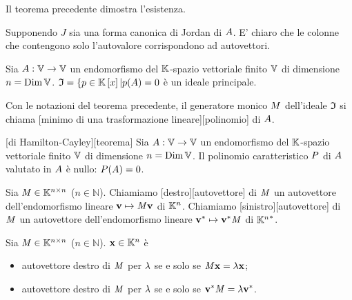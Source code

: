 \Proof Il teorema precedente dimostra l'esistenza.
\par Supponendo $J$ sia una forma canonica di Jordan di $A$.
E' chiaro che le colonne che contengono solo l'autovalore corrispondono ad
autovettori.
\begin{Theorem}
	Sia $A: \mathbb{V} \rightarrow \mathbb{V}$ un
  endomorfismo del $\mathbb{K}$-spazio vettoriale finito $\mathbb{V}$ di
  dimensione $n = \operatorname{\operatorname{Dim}}{\mathbb{V}}$.
  $\mathfrak{I}
    = \lbrace p \in \mathbb{K} \left [ x \right ]
    | p(A) = 0$
  \`e un ideale principale.
\end{Theorem}
\begin{Definition}
  Con le notazioni del teorema precedente, il generatore monico
  $M$ dell'ideale $\mathfrak{I}$ si chiama
  [minimo di una trasformazione lineare][polinomio]
  di $A$.
\end{Definition}
\begin{Theorem}
  [di Hamilton-Cayley][teorema]
	Sia $A: \mathbb{V} \rightarrow \mathbb{V}$ un
  endomorfismo del $\mathbb{K}$-spazio vettoriale finito $\mathbb{V}$ di
  dimensione $n = \operatorname{\operatorname{Dim}}{\mathbb{V}}$. Il polinomio caratteristico
  $P$ di $A$ valutato in
  $A$ \`e nullo:
  $P(A) = 0$.
\end{Theorem}
\begin{Definition}
  Sia $\mathit{M} \in \mathbb{K}^{n \times n}$ ($n \in \mathbb{N}$).
  Chiamiamo
  [destro][autovettore]
  di $\mathit{M}$ un autovettore dell'endomorfismo lineare
  $\mathbf{v} \mapsto \mathit{M}\mathbf{v}$ di $\mathbb{K}^n$.
  Chiamiamo
  [sinistro][autovettore]
  di $\mathit{M}$ un autovettore dell'endomorfismo lineare
  ${\mathbf{v}}^* \mapsto {\mathbf{v}}^*\mathit{M}$
  di ${{\mathbb{K}^n}^*}$.
\end{Definition}
\begin{Theorem}
  Sia $\mathit{M} \in \mathbb{K}^{n \times n}$ ($n \in \mathbb{N}$).
  $\Eigenvector \in \Field^n$ \`e
  \begin{itemize}
    \item autovettore destro di $\mathit{M}$ per $\lambda$ se e solo se
      $\Matrix\Eigenvector = \Eigenvalue\Eigenvector$;
    \item autovettore destro di $\mathit{M}$ per $\lambda$ se e solo se
      ${\mathbf{v}}^* \mathit{M}
      = \lambda{\mathbf{v}}^*$.
  \end{itemize}
\end{Theorem}
